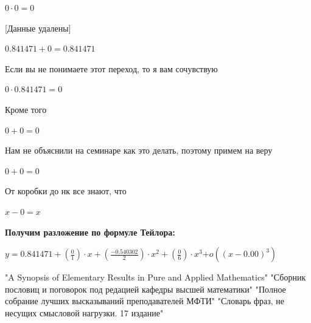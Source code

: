\documentclass[12pt,a4paper,fleqn]{article}
\begin{document}
\begin{center}$0 \cdot 0 = 0$\end{center}
[Данные удалены]

\begin{center}$0.841471+0 = 0.841471$\end{center}
Если вы не понимаете этот переход, то я вам сочувствую

\begin{center}$0 \cdot 0.841471 = 0$\end{center}
Кроме того

\begin{center}$0+0 = 0$\end{center}
Нам не объяснили на семинаре как это делать, поэтому примем на веру

\begin{center}$0+0 = 0$\end{center}
От коробки до нк все знают, что

\begin{center}
$x-0 = x$\end{center}
\textbf{\LARGE{Получим разложение по формуле Тейлора:}}
\begin{center}
$y = $$0.841471+(\frac{0}{1}) \cdot x+(\frac{-0.540302}{2}) \cdot x^{2}+(\frac{0}{6}) \cdot x^{3}$$ + o((x - 0.00)^{3})$
\end{center}
\newpage\begin{thebibliography}{}
  "A Synopsis of Elementary Results in Pure and Applied Mathematics"
  "Сборник пословиц и поговорок под редацией кафедры высшей математики"
  "Полное собрание лучших высказываний преподавателей МФТИ"
  "Словарь фраз, не несущих смысловой нагрузки. 17 издание"
\end{thebibliography}
\end{document}
